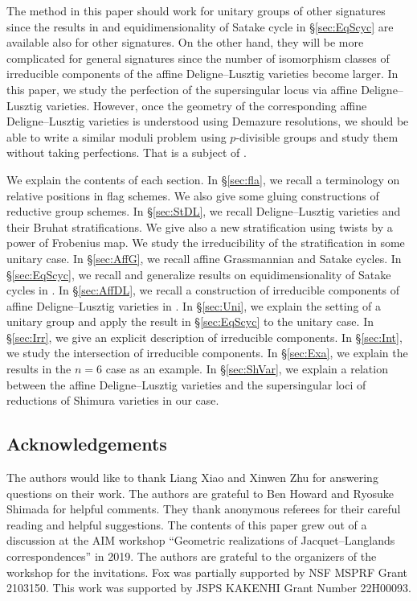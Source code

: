 \documentclass[12pt,a4paper]{article}
\begin{document}
The method in this paper should work for unitary groups of other signatures since the results in \cite{XiZhCycSh} and equidimensionality of Satake cycle in \S \ref{sec:EqScyc} 
are available also for other signatures. 
On the other hand, they will be more complicated for general signatures since 
the number of isomorphism classes of irreducible components of the affine Deligne--Lusztig varieties become larger. 
In this paper, we study the perfection of the supersingular locus via affine Deligne--Lusztig varieties. However, once the geometry of the corresponding affine Deligne--Lusztig varieties is understood using Demazure resolutions, we should be able to write a similar moduli problem using $p$-divisible groups and study them without taking perfections. 
That is a subject of \cite{FHIRZG}.

We explain the contents of each section. 
In \S \ref{sec:fla}, 
we recall a terminology on relative positions in flag schemes. 
We also give some gluing constructions of reductive group schemes.  
In \S \ref{sec:StDL}, 
we recall Deligne--Lusztig varieties and their Bruhat stratifications. 
We give also a new stratification 
using twists by a power of Frobenius map. 
We study the irreducibility of the stratification 
in some unitary case. 
In \S \ref{sec:AffG}, 
we recall affine Grassmannian and Satake cycles. 
In \S \ref{sec:EqScyc}, 
we recall and generalize 
results on equidimensionality of Satake cycles in 
\cite{HaiEquconv}. 
In \S \ref{sec:AffDL}, 
we recall a construction of irreducible components of 
affine Deligne--Lusztig varieties in \cite{XiZhCycSh}. 
In \S \ref{sec:Uni}, 
we explain the setting of a unitary group and 
apply the result in \S \ref{sec:EqScyc} to the unitary case.  
In \S \ref{sec:Irr}, 
we give an explicit description of irreducible components. 
In \S \ref{sec:Int}, 
we study the intersection of irreducible components. 
In \S \ref{sec:Exa}, 
we explain the results in the $n=6$ case as an example.   
In \S \ref{sec:ShVar}, 
we explain a relation between the 
affine Deligne--Lusztig varieties and the 
supersingular loci of reductions of Shimura varieties 
in our case. 

\subsection*{Acknowledgements}
The authors would like to thank Liang Xiao and Xinwen Zhu for answering questions on their work. The authors are grateful to Ben Howard and Ryosuke Shimada for helpful comments. They thank anonymous referees for their careful reading and helpful suggestions. 
The contents of this paper grew out of a discussion at the AIM workshop 
``Geometric realizations of Jacquet--Langlands correspondences'' in 2019. 
The authors are grateful to the organizers of the workshop for the invitations. Fox was partially supported by NSF MSPRF Grant 2103150. 
This work was supported by JSPS KAKENHI Grant Number 22H00093. 
\end{document}
